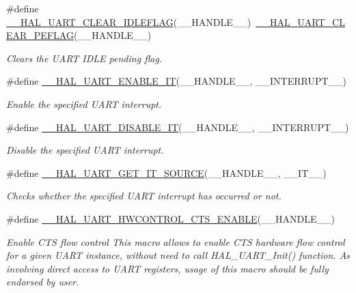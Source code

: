 \begin{DoxyCompactItemize}
\#define \hyperlink{group___u_a_r_t___exported___macros_ga1345aa0af53d82269b13835c225e91d0}{\+\_\+\+\_\+\+H\+A\+L\+\_\+\+U\+A\+R\+T\+\_\+\+C\+L\+E\+A\+R\+\_\+\+I\+D\+L\+E\+F\+L\+AG}(\+\_\+\+\_\+\+H\+A\+N\+D\+L\+E\+\_\+\+\_\+)~\hyperlink{group___u_a_r_t___exported___macros_gaba5e19c60e0f37341b1585a380b84d49}{\+\_\+\+\_\+\+H\+A\+L\+\_\+\+U\+A\+R\+T\+\_\+\+C\+L\+E\+A\+R\+\_\+\+P\+E\+F\+L\+AG}(\+\_\+\+\_\+\+H\+A\+N\+D\+L\+E\+\_\+\+\_\+)
\begin{DoxyCompactList}\small\item\em Clears the U\+A\+RT I\+D\+LE pending flag. \end{DoxyCompactList}\item 
\#define \hyperlink{group___u_a_r_t___exported___macros_gaba94165ed584d49c1ec12df9819bd4bb}{\+\_\+\+\_\+\+H\+A\+L\+\_\+\+U\+A\+R\+T\+\_\+\+E\+N\+A\+B\+L\+E\+\_\+\+IT}(\+\_\+\+\_\+\+H\+A\+N\+D\+L\+E\+\_\+\+\_\+,  \+\_\+\+\_\+\+I\+N\+T\+E\+R\+R\+U\+P\+T\+\_\+\+\_\+)
\begin{DoxyCompactList}\small\item\em Enable the specified U\+A\+RT interrupt. \end{DoxyCompactList}\item 
\#define \hyperlink{group___u_a_r_t___exported___macros_ga3c29b33f38658acbf592e9aaf84c6f33}{\+\_\+\+\_\+\+H\+A\+L\+\_\+\+U\+A\+R\+T\+\_\+\+D\+I\+S\+A\+B\+L\+E\+\_\+\+IT}(\+\_\+\+\_\+\+H\+A\+N\+D\+L\+E\+\_\+\+\_\+,  \+\_\+\+\_\+\+I\+N\+T\+E\+R\+R\+U\+P\+T\+\_\+\+\_\+)
\begin{DoxyCompactList}\small\item\em Disable the specified U\+A\+RT interrupt. \end{DoxyCompactList}\item 
\#define \hyperlink{group___u_a_r_t___exported___macros_gab7ad503802bf56bf397c392fc8e18b77}{\+\_\+\+\_\+\+H\+A\+L\+\_\+\+U\+A\+R\+T\+\_\+\+G\+E\+T\+\_\+\+I\+T\+\_\+\+S\+O\+U\+R\+CE}(\+\_\+\+\_\+\+H\+A\+N\+D\+L\+E\+\_\+\+\_\+,  \+\_\+\+\_\+\+I\+T\+\_\+\+\_\+)
\begin{DoxyCompactList}\small\item\em Checks whether the specified U\+A\+RT interrupt has occurred or not. \end{DoxyCompactList}\item 
\#define \hyperlink{group___u_a_r_t___exported___macros_ga4a77213945844bca4c22ba6a14b7ee4c}{\+\_\+\+\_\+\+H\+A\+L\+\_\+\+U\+A\+R\+T\+\_\+\+H\+W\+C\+O\+N\+T\+R\+O\+L\+\_\+\+C\+T\+S\+\_\+\+E\+N\+A\+B\+LE}(\+\_\+\+\_\+\+H\+A\+N\+D\+L\+E\+\_\+\+\_\+)
\begin{DoxyCompactList}\small\item\em Enable C\+TS flow control This macro allows to enable C\+TS hardware flow control for a given U\+A\+RT instance, without need to call H\+A\+L\+\_\+\+U\+A\+R\+T\+\_\+\+Init() function. As involving direct access to U\+A\+RT registers, usage of this macro should be fully endorsed by user. \end{DoxyCompactList}\item 

\end{DoxyCompactItemize}
